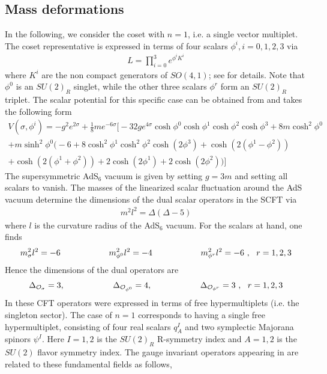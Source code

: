 \documentclass[12pt]{article}
\begin{document}
\subsection{Mass deformations}
In the following, we consider the coset with $n=1$, i.e. a single vector multiplet. The coset representative is expressed in terms of four scalars $\phi^i, i=0,1,2,3$ via
\begin{eqnarray}
L=\prod_{i=0}^3e^{\phi^i K^i}
\end{eqnarray}
where $K^i$ are the non compact generators of $SO(4,1)$; see  for details. Note that  $\phi^0$ is an $SU(2)_R$ singlet, while the other three scalars $\phi^r$ form an $SU(2)_R$ triplet. 
The scalar potential for this specific case can be obtained from and takes the following form
\begin{align}
V(\sigma,\phi^i) =- g^2 e^{2 \sigma }+\frac{1}{8} m e^{-6 \sigma } \bigg[-32 g e^{4 \sigma } \cosh \phi^0 \cosh \phi^1 \cosh \phi^2 \cosh \phi^3+8 m \cosh ^2\phi^0
\nonumber\\
+m \sinh ^2 \phi^0 \bigg(-6+8 \cosh ^2\phi^1 \cosh ^2 \phi^2 \cosh (2 \phi^3)+\cosh (2 (\phi^1-\phi^2))\nonumber\\
+\cosh (2 (\phi^1+\phi^2))+2 \cosh (2 \phi^1)+2 \cosh (2 \phi^2)\bigg)\bigg]
\end{align}
The supersymmetric AdS$_6$ vacuum is given by setting $g=3m$ and setting all scalars to vanish. The masses of the  linearized  scalar fluctuation around the AdS vacuum  determine the dimensions of the dual scalar operators in the SCFT via
\begin{eqnarray}
m^2l^2= \Delta(\Delta-5)
\end{eqnarray}
where $l$ is the curvature radius of the AdS$_6$ vacuum. For the scalars at hand, one finds
\begin{eqnarray}
m_\sigma^2 l^2 = -6 \hspace{0.8 in} m_{\phi^0}^2 l^2 = -4 \hspace{0.8 in} m_{\phi^r}^2 l^2 = -6\,\,,\,\,\,\,r=1,2,3
\end{eqnarray}
Hence the dimensions of the dual operators are 
\begin{eqnarray}
\Delta_{{\cal O}_\sigma} = 3, \hspace{0.8 in} \Delta_{{\cal O}_{\phi^0}} = 4, \hspace{0.8 in} \Delta_{{\cal O}_{\phi^r}} = 3\,\,,\,\,\,\,r=1,2,3
\end{eqnarray}
In  these CFT operators were expressed in terms of free hypermultiplets (i.e. the singleton sector). The case of $n=1$ corresponds to having a single free hypermultiplet, consisting of four real scalars $q_A^I$ and two symplectic Majorana spinors $\psi ^I$. Here $I=1,2$ is the $SU(2)_R$ R-symmetry index and $A=1,2$ is the $SU(2)$ flavor symmetry index. The gauge invariant operators appearing in are related to these fundamental fields as follows,
\end{document}
